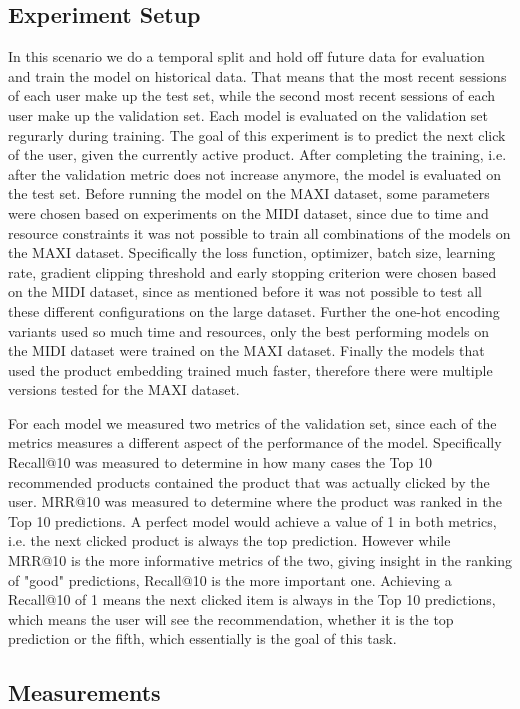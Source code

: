 \subsection{Experiment Setup}\label{sec:exp_setup}
In this scenario we do a temporal split and hold off future data for evaluation and train the model on historical data.
That means that the most recent sessions of each user make up the test set, while the second most recent sessions of each user make up the validation set.
Each model is evaluated on the validation set regurarly during training.
The goal of this experiment is to predict the next click of the user, given the currently active product.
After completing the training, i.e. after the validation metric does not increase anymore, the model is evaluated on the test set.
Before running the model on the MAXI dataset, some parameters were chosen based on experiments on the MIDI dataset, since due to time and resource constraints it was not possible to train all combinations of the models on the MAXI dataset.
Specifically the loss function, optimizer, batch size, learning rate, gradient clipping threshold and early stopping criterion were chosen based on the MIDI dataset, since as mentioned before it was not possible to test all these different configurations on the large dataset.
Further the one-hot encoding variants used so much time and resources, only the best performing models on the MIDI dataset were trained on the MAXI dataset.
Finally the models that used the product embedding trained much faster, therefore there were multiple versions tested for the MAXI dataset.
\par
For each model we measured two metrics of the validation set, since each of the metrics measures a different aspect of the performance of the model.
Specifically Recall@10 was measured to determine in how many cases the Top 10 recommended products contained the product that was actually clicked by the user.
MRR@10 was measured to determine where the product was ranked in the Top 10 predictions.
A perfect model would achieve a value of 1 in both metrics, i.e. the next clicked product is always the top prediction.
However while MRR@10 is the more informative metrics of the two, giving insight in the ranking of "good" predictions, Recall@10 is the more important one.
Achieving a Recall@10 of 1 means the next clicked item is always in the Top 10 predictions, which means the user will see the recommendation, whether it is the top prediction or the fifth, which essentially is the goal of this task.
\subsection{Measurements}

